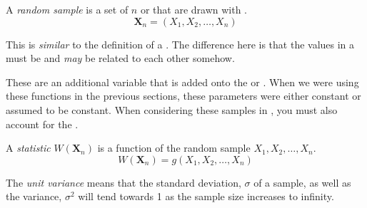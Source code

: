 \begin{definition}\label{def:Random Sample}
  A \emph{random sample} is a set of $n$  or  that are drawn with .
  \begin{equation}\label{eq:Random Sample}
    \mathbf{X}_{n} = \left( X_{1},X_{2},\ldots,X_{n} \right)
  \end{equation}
  \begin{remark}
    This is \emph{similar} to the definition of a .
    The difference here is that the values in a  must be  and \emph{may} be related to each other somehow.
  \end{remark}
  \begin{remark}\label{rmk:Random Sample Parameters}
    These are an additional variable that is added onto the  or .
    When we were using these functions in the previous sections, these parameters were either constant or assumed to be constant.
    When considering these samples in , you must also account for the .
  \end{remark}
\end{definition}
\begin{definition}[Statistic]\label{def:Statistic}
  A \emph{statistic} $W (\mathbf{X}_{n})$ is a function of the random sample $X_{1},X_{2},\ldots,X_{n}$.
  \begin{equation}\label{eq:Statistic}
    W \left( \mathbf{X}_{n} \right) = g \left( X_{1},X_{2},\ldots,X_{n} \right)
  \end{equation}
\end{definition}
\begin{definition}\label{def:Unit Variance}
  The \emph{unit variance} means that the standard deviation, $\sigma$ of a sample, as well as the variance, $\sigma^{2}$ will tend towards 1 as the sample size increases to infinity.
\end{definition}

